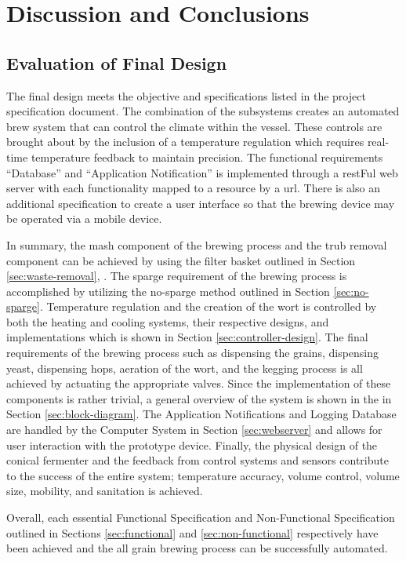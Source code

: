 \documentclass{article}
\begin{document}
\section{Discussion and Conclusions}
\subsection{Evaluation of Final Design}
The final design meets the objective and specifications listed in the project specification document. The combination of the subsystems creates an automated brew system that can control the climate within the vessel.  These controls are brought about by the inclusion of a temperature regulation which requires real-time temperature feedback to maintain precision. The functional requirements ``Database'' and ``Application Notification'' is implemented through a \gls{rest}Ful web server with each functionality mapped to a \gls{resource} by a \gls{url}. There is also an additional specification to create a user interface so that the brewing device may be operated via a mobile device.

In summary, the \gls{mash} component of the brewing process and the \gls{trub} removal component can be achieved by using the filter basket outlined in Section \ref{sec:waste-removal}, .  The \gls{sparge} requirement of the brewing process is accomplished by utilizing the no-sparge method outlined in Section \ref{sec:no-sparge}.  Temperature regulation and the creation of the \gls{wort} is controlled by both the heating and cooling systems, their respective designs, and implementations which is shown in Section \ref{sec:controller-design}.  The final requirements of the brewing process such as dispensing the grains, dispensing yeast, dispensing hops, aeration of the \gls{wort}, and the kegging process is all achieved by actuating the appropriate valves.  Since the implementation of these components is rather trivial, a general overview of the system is shown in the  in Section \ref{sec:block-diagram}.  The Application Notifications and Logging Database are handled by the Computer System in Section \ref{sec:webserver} and allows for user interaction with the prototype device.  Finally, the physical design of the conical fermenter and the feedback from control systems and sensors contribute to the success of the entire system; temperature accuracy, volume control, volume size, mobility, and sanitation is achieved.

Overall, each essential Functional Specification and Non-Functional Specification outlined in Sections \ref{sec:functional} and \ref{sec:non-functional} respectively have been achieved and the all grain brewing process can be successfully automated.
\end{document}
